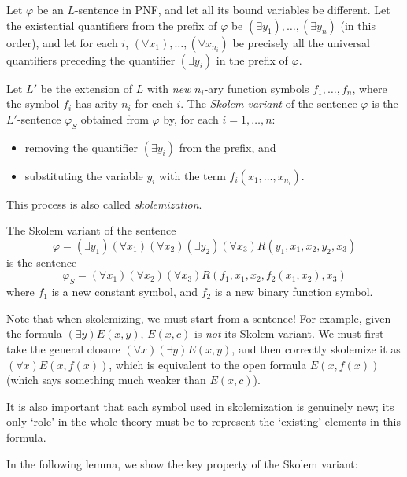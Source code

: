\begin{definition}
Let $\varphi$ be an $L$-sentence in PNF, and let all its bound variables be different. Let the existential quantifiers from the prefix of $\varphi$ be $(\exists y_1),\dots,(\exists y_n)$ (in this order), and let for each $i$, $(\forall x_1),\dots,(\forall x_{n_i})$ be precisely all the universal quantifiers preceding the quantifier $(\exists y_i)$ in the prefix of $\varphi$. 

Let $L'$ be the extension of $L$ with \emph{new} $n_i$-ary function symbols $f_1,\dots,f_n$, where the symbol $f_i$ has arity $n_i$ for each $i$. The \emph{Skolem variant} of the sentence $\varphi$ is the $L'$-sentence $\varphi_S$ obtained from $\varphi$ by, for each $i=1,\dots,n$:
\begin{itemize}
    \item removing the quantifier $(\exists y_i)$ from the prefix, and
    \item substituting the variable $y_i$ with the term $f_i(x_1,\dots,x_{n_i})$.
\end{itemize}
This process is also called \emph{skolemization}.
\end{definition}

\begin{example}
    The Skolem variant of the sentence 
    $$\varphi=(\exists y_1)(\forall x_1)(\forall x_2)(\exists y_2)(\forall x_3)R(y_1,x_1,x_2,y_2,x_3)$$
    is the sentence
    $$
    \varphi_S=(\forall x_1)(\forall x_2)(\forall x_3)R(f_1,x_1,x_2,f_2(x_1,x_2),x_3)
    $$
    where $f_1$ is a new constant symbol, and $f_2$ is a new binary function symbol.
\end{example}

\begin{remark}
    Note that when skolemizing, we must start from a sentence! For example, given the formula $(\exists y)E(x,y)$, $E(x,c)$ is \emph{not} its Skolem variant. We must first take the general closure $(\forall x)(\exists y)E(x,y)$, and then correctly skolemize it as $(\forall x)E(x,f(x))$, which is equivalent to the open formula $E(x,f(x))$ (which says something much weaker than $E(x,c)$).

    It is also important that each symbol used in skolemization is genuinely new; its only `role' in the whole theory must be to represent the `existing' elements in this formula.
\end{remark} 

In the following lemma, we show the key property of the Skolem variant:

